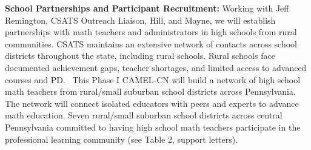 \documentclass[11pt]{article}
\begin{document}
\textbf{School Partnerships and Participant Recruitment:} Working with Jeff Remington, CSATS Outreach Liaison, Hill, and Mayne, we will establish partnerships with math teachers and administrators in high schools from rural communities.
CSATS maintains an extensive network of contacts across school districts throughout the state, including rural schools. 
Rural schools face documented achievement gaps, teacher shortages, and limited access to advanced courses and PD.~\cite{NASEM2025}
This Phase I CAMEL-CN will build a network of high school math teachers from rural/small suburban school districts across Pennsylvania.
The network will connect isolated educators with peers and experts to advance math education.
Seven rural/small suburban school districts across central Pennsylvania committed to having high school math teachers participate in the professional learning community (see Table 2, support letters). 


\end{document}
